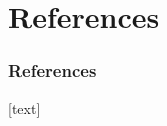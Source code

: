 \documentclass{beamer}
\begin{document}
\section*{References}




\begin{frame}[allowframebreaks]\frametitle{References}
	[text] %
%	
%	
	
	\tiny
	
\end{frame}





\end{document}

